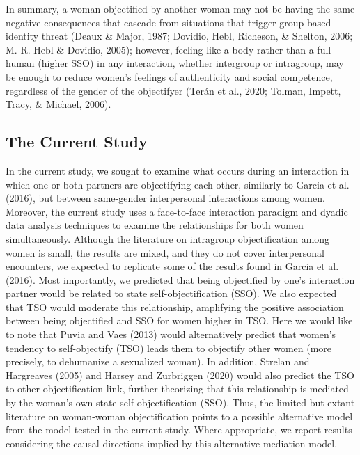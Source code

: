 \documentclass[man]{apa6}
\begin{document}
In summary, a woman objectified by another woman may not be having the
same negative consequences that cascade from situations that trigger
group-based identity threat (Deaux \& Major, 1987; Dovidio, Hebl,
Richeson, \& Shelton, 2006; M. R. Hebl \& Dovidio, 2005); however,
feeling like a body rather than a full human (higher SSO) in any
interaction, whether intergroup or intragroup, may be enough to reduce
women's feelings of authenticity and social competence, regardless of
the gender of the objectifyer (Terán et al., 2020; Tolman, Impett,
Tracy, \& Michael, 2006).

\subsection{The Current Study}\label{the-current-study}

In the current study, we sought to examine what occurs during an
interaction in which one or both partners are objectifying each other,
similarly to Garcia et al. (2016), but between same-gender interpersonal
interactions among women. Moreover, the current study uses a
face-to-face interaction paradigm and dyadic data analysis techniques to
examine the relationships for both women simultaneously. Although the
literature on intragroup objectification among women is small, the
results are mixed, and they do not cover interpersonal encounters, we
expected to replicate some of the results found in Garcia et al. (2016).
Most importantly, we predicted that being objectified by one's
interaction partner would be related to state self-objectification
(SSO). We also expected that TSO would moderate this relationship,
amplifying the positive association between being objectified and SSO
for women higher in TSO. Here we would like to note that Puvia and Vaes
(2013) would alternatively predict that women's tendency to
self-objectify (TSO) leads them to objectify other women (more
precisely, to dehumanize a sexualized woman). In addition, Strelan and
Hargreaves (2005) and Harsey and Zurbriggen (2020) would also predict
the TSO to other-objectification link, further theorizing that this
relationship is mediated by the woman's own state self-objectification
(SSO). Thus, the limited but extant literature on woman-woman
objectification points to a possible alternative model from the model
tested in the current study. Where appropriate, we report results
considering the causal directions implied by this alternative mediation
model.
\end{document}
